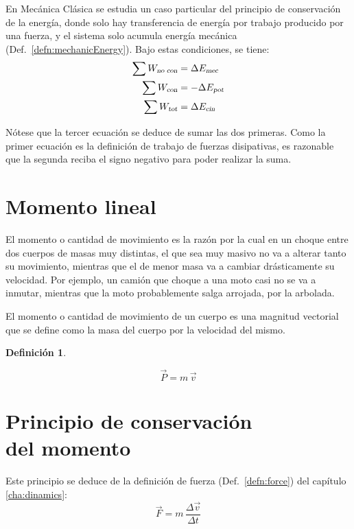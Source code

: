 \documentclass[a5paper,12pt,twoside]{book}
\newtheorem{defn}{{Definición}}[chapter]
\begin{document}
En Mecánica Clásica se estudia un caso particular del principio de conservación de la energía, donde solo hay transferencia de energía por trabajo producido por una fuerza, y el sistema solo acumula energía mecánica (Def.\ \ref{defn:mechanicEnergy}). Bajo estas condiciones, se tiene:
\begin{align*}
    \sum {{W}_\textsl{{no con}}} &= \Delta {{E}_\textsl{{mec}}}
    \\
    \sum {{W}_\textsl{{con}}} &= - \Delta {{E}_\textsl{{pot}}}
    \\
    \sum {{W}_\textsl{{tot}}} &= \Delta {{E}_\textsl{{cin}}}
\end{align*}

Nótese que la tercer ecuación se deduce de sumar las dos primeras. Como la primer ecuación es la definición de trabajo de fuerzas disipativas, es razonable que la segunda reciba el signo negativo para poder realizar la suma.


\section{Momento lineal}

El momento o cantidad de movimiento es la razón por la cual en un choque entre dos cuerpos de masas muy distintas, el que sea muy masivo no va a alterar tanto su movimiento, mientras que el de menor masa va a cambiar drásticamente su velocidad. Por ejemplo, un camión que choque a una moto casi no se va a inmutar, mientras que la moto probablemente salga arrojada, por la arbolada.

El momento o cantidad de movimiento de un cuerpo es una magnitud vectorial que se define como la masa del cuerpo por la velocidad del mismo.

\begin{mdframed}[style=MyFrame1]
    \begin{defn}
        \label{defn:momentum}
    \end{defn}
    \begin{equation*}
        \Vec{P} = m \, \Vec{v}
    \end{equation*}
\end{mdframed}


\section[Principio de conservación del momento]{Principio de conservación \\ del momento}

Este principio se deduce de la definición de fuerza (Def.\ \ref{defn:force}) del capítulo \ref{cha:dinamics}:
\[ \Vec{F} = m \, \frac{\Delta \Vec{v}}{\Delta t} \]
\end{document}
